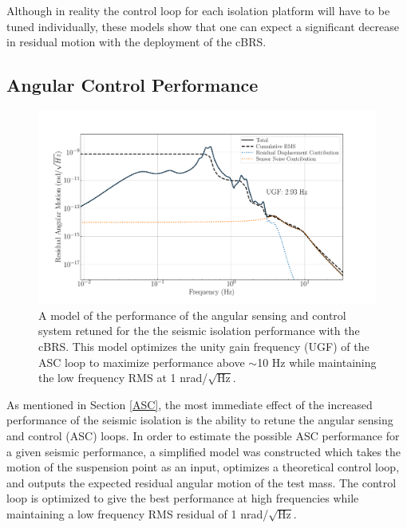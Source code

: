 \documentclass [12pt, proquest]{uwthesis}[2019]
\begin{document}
Although in reality the control loop for each isolation platform will have to be tuned individually, these models show that one can expect a significant decrease in residual motion with the deployment of the cBRS. 

\subsection{Angular Control Performance}

\begin{figure}[!h]
\begin{center}
\includegraphics[width=\textwidth]{cBRS_ASC_With.pdf}
\caption[Projected performance of the angular sensing and control system]{A model of the performance of the angular sensing and control system retuned for the the seismic isolation performance with the cBRS. This model optimizes the unity gain frequency (UGF) of the ASC loop to maximize performance above $\sim$10 Hz while maintaining the low frequency RMS at 1 nrad/$\sqrt{\text{Hz}}$.}
\label{ascWith}
\end{center}
\end{figure}

As mentioned in Section \ref{ASC}, the most immediate effect of the increased performance of the seismic isolation is the ability to retune the angular sensing and control (ASC) loops. In order to estimate the possible ASC performance for a given seismic performance, a simplified model was constructed \cite{ascModel} which takes the motion of the suspension point as an input, optimizes a theoretical control loop, and outputs the expected residual angular motion of the test mass. The control loop is optimized to give the best performance at high frequencies while maintaining a low frequency RMS residual of 1 nrad/$\sqrt{\text{Hz}}$.
\end{document}
